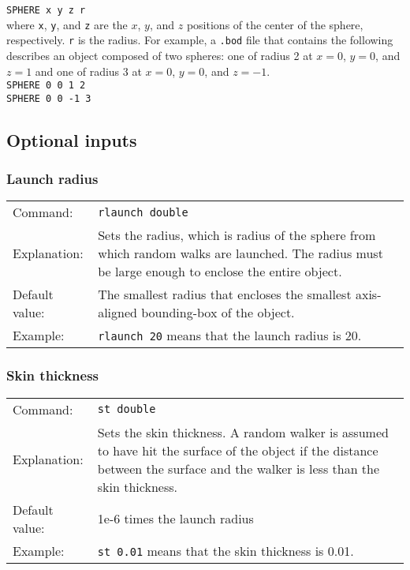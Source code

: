 \documentclass[12pt,letterpaper]{article}
\begin{document}
\texttt{SPHERE x y z r} \\

where \texttt{x}, \texttt{y}, and \texttt{z} are the $x$, $y$, and $z$ positions of the center of the sphere, respectively. \texttt{r} is the radius. For example, a \texttt{.bod} file that contains the following describes an object composed of two spheres: one of radius 2 at $x=0$, $y=0$, and $z=1$ and one of radius 3 at $x=0$, $y=0$, and $z=-1$.\\

\texttt{SPHERE 0 0 1 2} \\
\indent \texttt{SPHERE 0 0 -1 3}

\subsection{Optional inputs}
\label{sec:optinputs}

\subsubsection{Launch radius}
\begin{tabular}{p{1in} p{5.5in}}
Command: & \texttt{rlaunch double} \\ 
Explanation: & Sets the radius, which is radius of the sphere from which random walks are launched. The radius must be large enough to enclose the entire object. \\
Default value: & The smallest radius that encloses the smallest axis-aligned bounding-box of the object. \\ 
Example: & \texttt{rlaunch 20} means that the launch radius is 20.
\end{tabular}

\subsubsection{Skin thickness}
\begin{tabular}{p{1in} p{5in}}
Command: & \texttt{st double} \\ 
Explanation: & Sets the skin thickness. A random walker is assumed to have hit the surface of the object if the distance between the surface and the walker is less than the skin thickness. \\
Default value: & 1e-6 times the launch radius \\
Example: &\texttt{st 0.01} means that the skin thickness is 0.01.
\end{tabular}
\end{document}
